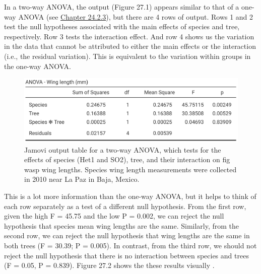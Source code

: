 \documentclass[
  openany]{krantz}
\begin{document}
In a two-way ANOVA, the output (Figure 27.1) appears similar to that of a one-way ANOVA (see \protect\hyperlink{anova-f-statistic-calculation}{Chapter 24.2.3}), but there are 4 rows of output.
Rows 1 and 2 test the null hypotheses associated with the main effects of species and tree, respectively.
Row 3 tests the interaction effect.
And row 4 shows us the variation in the data that cannot be attributed to either the main effects or the interaction (i.e., the residual variation).
This is equivalent to the variation within groups in the one-way ANOVA.

\begin{figure}
\includegraphics[width=1\linewidth]{img/jamovi_two-way_ANOVA_no_interaction} \caption{Jamovi output table for a two-way ANOVA, which tests for the effects of species (Het1 and SO2), tree, and their interaction on fig wasp wing lengths. Species wing length measurements were collected in 2010 near La Paz in Baja, Mexico.}\label{fig:unnamed-chunk-107}
\end{figure}

This is a lot more information than the one-way ANOVA, but it helps to think of each row separately as a test of a different null hypothesis.
From the first row, given the high F = 45.75 and the low P = 0.002, we can reject the null hypothesis that species mean wing lengths are the same.
Similarly, from the second row, we can reject the null hypothesis that wing lengths are the same in both trees (F = 30.39; P = 0.005).
In contrast, from the third row, we should not reject the null hypothesis that there is no interaction between species and trees (F = 0.05, P = 0.839).
Figure 27.2 shows the these results visually \citep{Jamovi2022}.
\end{document}
